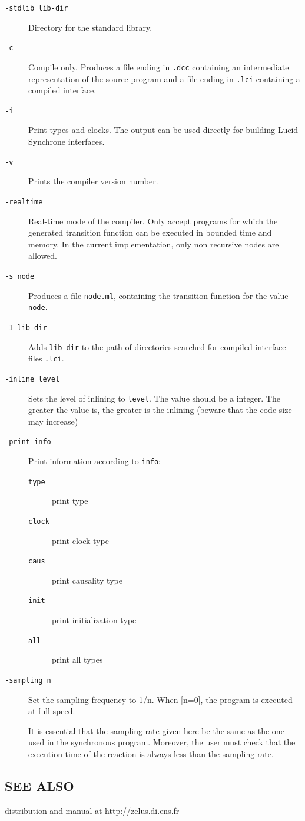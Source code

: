 \documentclass[11pt,titlepage,twoside]{report}
\begin{document}
\begin{description}
\item[\tt -stdlib lib-dir]
Directory for the standard library.
\item[\tt -c]
Compile only. Produces a file ending in \verb-.dcc- containing an
intermediate representation of the source program and a 
file ending in \verb-.lci- containing a compiled interface.
\item[\tt -i] 
Print types and clocks. The output can be used directly for building
Lucid Synchrone interfaces.
\item[\tt -v]
Prints the compiler version number.
\item[\tt -realtime]
Real-time mode of the compiler. Only accept programs for which the
generated transition function can be executed in bounded time and
memory. In the current implementation, only non recursive nodes are
allowed. 
\item[\tt -s node]
Produces a file \verb-node.ml-, 
containing the transition function for the value
\verb-node-.
\item[\tt -I lib-dir]
Adds \verb+lib-dir+ 
to the path of directories searched for compiled interface files \verb-.lci-.
\item[\tt -inline level]
Sets the level of inlining to
\verb-level-.
The value should be a integer. The greater the value is, the greater is
the inlining (beware that the code size may increase)
\item[\tt -print info]
Print information according to \verb-info-:
\begin{description}
\item[\tt type] print type
\item[\tt clock] print clock type
\item[\tt caus] print causality type
\item[\tt init] print initialization type
\item[\tt all] print all types
\end{description}
\item[\tt -sampling n]
Set the sampling frequency to 1/n. When [n=0], the program is
executed at full speed.

It is essential that the sampling rate given here be the same as the
one used in the synchronous program. Moreover, the
user must check that the execution time of the reaction is always less
than the sampling rate.
\end{description}

\subsection*{SEE ALSO}
distribution and manual at \url{http://zelus.di.ens.fr}
\end{document}
